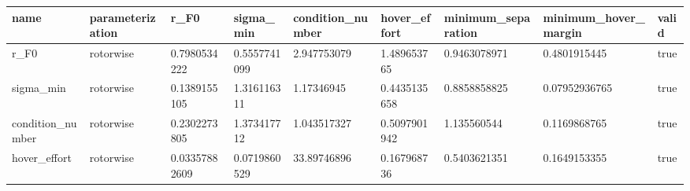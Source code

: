 \begin{tabular}{@{}lllllllll@{}}
\toprule
name & parameterization & r\_F0 & sigma\_min & condition\_number & hover\_effort & minimum\_separation & minimum\_hover\_margin & valid \\
\midrule
r\_F0 & rotorwise & 0.7980534222 & 0.5557741099 & 2.947753079 & 1.489653765 & 0.9463078971 & 0.4801915445 & true \\
sigma\_min & rotorwise & 0.1389155105 & 1.316116311 & 1.17346945 & 0.4435135658 & 0.8858858825 & 0.07952936765 & true \\
condition\_number & rotorwise & 0.2302273805 & 1.373417712 & 1.043517327 & 0.5097901942 & 1.135560544 & 0.1169868765 & true \\
hover\_effort & rotorwise & 0.03357882609 & 0.0719860529 & 33.89746896 & 0.167968736 & 0.5403621351 & 0.1649153355 & true \\
\bottomrule
\end{tabular}
